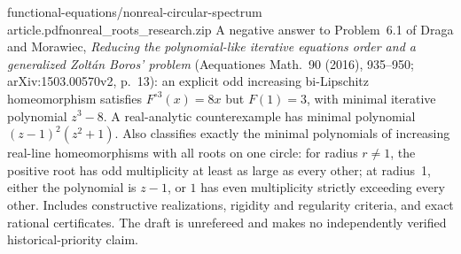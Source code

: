 {functional-equations/nonreal-circular-spectrum}
{article.pdf}{nonreal\_roots\_research.zip}
{A negative answer to Problem~6.1 of Draga and Morawiec,
\emph{Reducing the polynomial-like iterative equations order and a generalized
Zolt\'an Boros' problem} (Aequationes Math.\ 90 (2016), 935--950;
arXiv:1503.00570v2, p.~13): an explicit odd increasing bi-Lipschitz
homeomorphism satisfies $F^{\circ3}(x)=8x$ but $F(1)=3$, with minimal
iterative polynomial $z^3-8$. A real-analytic counterexample has minimal
polynomial $(z-1)^2(z^2+1)$. Also classifies exactly the minimal polynomials
of increasing real-line homeomorphisms with all roots on one circle:
for radius $r\ne1$, the positive root has odd multiplicity at least as
large as every other; at radius~1, either the polynomial is $z-1$, or
$1$ has even multiplicity strictly exceeding every other. Includes
constructive realizations, rigidity and regularity criteria, and exact
rational certificates. The draft is unrefereed and makes no independently
verified historical-priority claim.}
